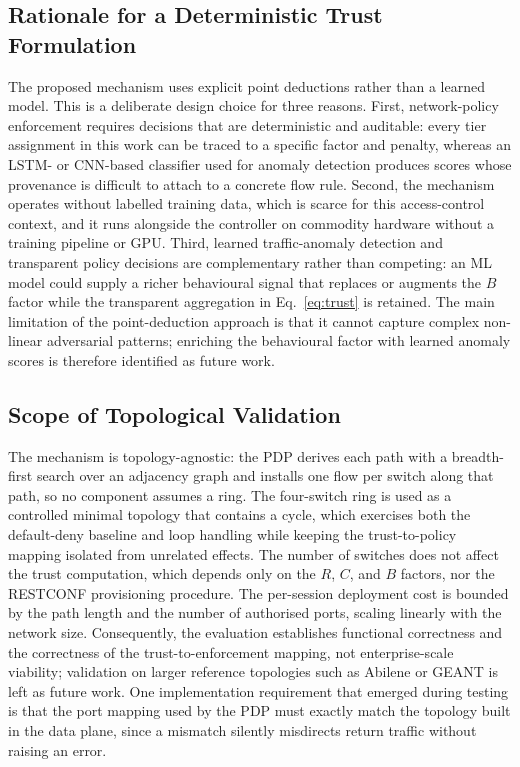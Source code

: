 \subsection{Rationale for a Deterministic Trust Formulation}
\label{sec:why-not-ml}
The proposed mechanism uses explicit point deductions rather than a learned
model. This is a deliberate design choice for three reasons. First,
network-policy enforcement requires decisions that are deterministic and
auditable: every tier assignment in this work can be traced to a specific factor
and penalty, whereas an LSTM- or CNN-based classifier used for anomaly detection
\cite{guo2023intelligent} produces scores whose provenance is difficult to
attach to a concrete flow rule. Second, the mechanism operates without labelled
training data, which is scarce for this access-control context, and it runs
alongside the controller on commodity hardware without a training pipeline or
GPU. Third, learned traffic-anomaly detection and transparent policy decisions
are complementary rather than competing: an ML model could supply a richer
behavioural signal that replaces or augments the $B$ factor while the
transparent aggregation in Eq.~\eqref{eq:trust} is retained. The main limitation
of the point-deduction approach is that it cannot capture complex non-linear
adversarial patterns; enriching the behavioural factor with learned anomaly
scores is therefore identified as future work.


\subsection{Scope of Topological Validation}
\label{sec:topology-scope}
The mechanism is topology-agnostic: the PDP derives each path with a
breadth-first search over an adjacency graph and installs one flow per switch
along that path, so no component assumes a ring. The four-switch ring is used
as a controlled minimal topology that contains a cycle, which exercises both the
default-deny baseline and loop handling while keeping the trust-to-policy
mapping isolated from unrelated effects. The number of switches does not affect
the trust computation, which depends only on the $R$, $C$, and $B$ factors, nor
the RESTCONF provisioning procedure. The per-session deployment cost is bounded
by the path length and the number of authorised ports, scaling linearly with the
network size. Consequently, the evaluation establishes functional correctness
and the correctness of the trust-to-enforcement mapping, not enterprise-scale
viability; validation on larger reference topologies such as Abilene or GEANT is
left as future work. One implementation requirement that emerged during testing
is that the port mapping used by the PDP must exactly match the topology built
in the data plane, since a mismatch silently misdirects return traffic without
raising an error.


